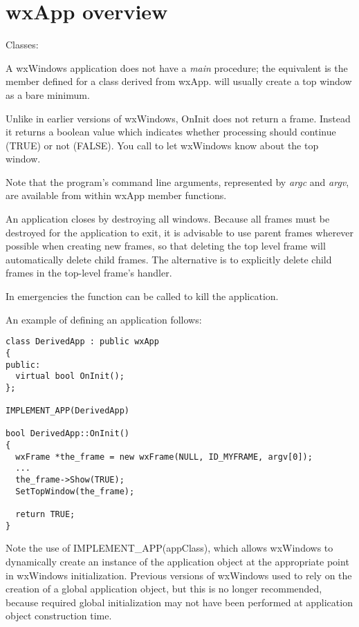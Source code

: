 \section{wxApp overview}\label{wxappoverview}

Classes: 

A wxWindows application does not have a {\it main} procedure; the equivalent is the
\rtfsp{} member defined for a class derived from wxApp.\rtfsp
{} will usually create a top window as a bare minimum.

Unlike in earlier versions of wxWindows, OnInit does not return a frame. Instead it
returns a boolean value which indicates whether processing should continue (TRUE) or not (FALSE).
You call  to let wxWindows know
about the top window.

Note that the program's command line arguments, represented by {\it argc} 
and {\it argv}, are available from within wxApp member functions.

An application closes by destroying all windows. Because all frames must
be destroyed for the application to exit, it is advisable to use parent
frames wherever possible when creating new frames, so that deleting the
top level frame will automatically delete child frames. The alternative
is to explicitly delete child frames in the top-level frame's \rtfsp
handler.

In emergencies the  function can be called to kill the
application.

An example of defining an application follows:

\begin{verbatim}
class DerivedApp : public wxApp
{
public:
  virtual bool OnInit();
};

IMPLEMENT_APP(DerivedApp)

bool DerivedApp::OnInit()
{
  wxFrame *the_frame = new wxFrame(NULL, ID_MYFRAME, argv[0]);
  ...
  the_frame->Show(TRUE);
  SetTopWindow(the_frame);

  return TRUE;
}
\end{verbatim}

Note the use of IMPLEMENT\_APP(appClass), which allows wxWindows to dynamically create an instance of the application object
at the appropriate point in wxWindows initialization. Previous versions of wxWindows used
to rely on the creation of a global application object, but this is no longer recommended,
because required global initialization may not have been performed at application object
construction time.

